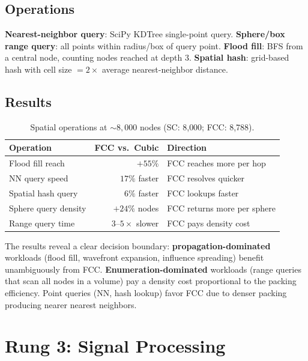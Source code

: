 \documentclass[11pt]{article}
\begin{document}
\subsection{Operations}

\textbf{Nearest-neighbor query}: SciPy KDTree single-point query.
\textbf{Sphere/box range query}: all points within radius/box of
query point. \textbf{Flood fill}: BFS from a central node, counting
nodes reached at depth 3. \textbf{Spatial hash}: grid-based hash
with cell size $= 2 \times$ average nearest-neighbor distance.

\subsection{Results}

\begin{table}[H]
\centering
\caption{Spatial operations at ${\sim}8{,}000$ nodes
(SC: 8{,}000; FCC: 8{,}788).}
\label{tab:spatial}
\begin{tabular}{lrl}
\toprule
Operation & FCC vs.\ Cubic & Direction \\
\midrule
Flood fill reach & $+55\%$ & FCC reaches more per hop \\
NN query speed & $17\%$ faster & FCC resolves quicker \\
Spatial hash query & $6\%$ faster & FCC lookups faster \\
Sphere query density & $+24\%$ nodes & FCC returns more per sphere \\
Range query time & $3$--$5\times$ slower & FCC pays density cost \\
\bottomrule
\end{tabular}
\end{table}

The results reveal a clear decision boundary:
\textbf{propagation-dominated} workloads (flood fill, wavefront
expansion, influence spreading) benefit unambiguously from FCC.
\textbf{Enumeration-dominated} workloads (range queries that scan
all nodes in a volume) pay a density cost proportional to the
packing efficiency. Point queries (NN, hash lookup) favor FCC
due to denser packing producing nearer nearest neighbors.

\section{Rung 3: Signal Processing}
\label{sec:signal}
\end{document}
